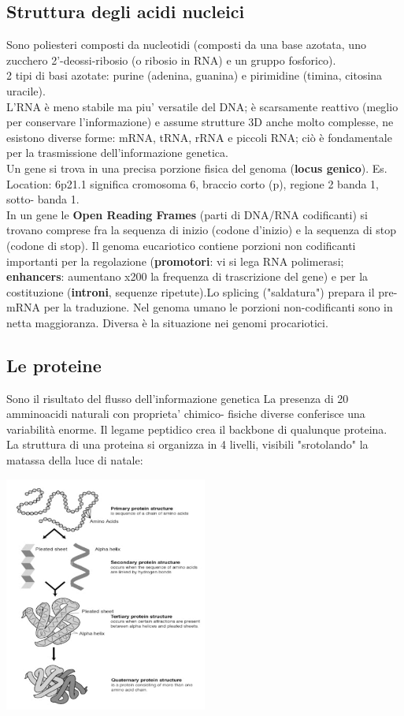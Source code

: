 \documentclass{article}
\begin{document}
\subsection{Struttura degli acidi nucleici}
Sono poliesteri composti da nucleotidi (composti da una base azotata, uno
zucchero 2'-deossi-ribosio (o ribosio in RNA) e un gruppo fosforico).\\
2 tipi di basi azotate: purine (adenina, guanina) e pirimidine (timina, citosina
uracile).\\
L'RNA è meno stabile ma piu' versatile del DNA; è scarsamente reattivo
(meglio per conservare l'informazione) e assume strutture 3D anche molto
complesse, ne esistono diverse forme: mRNA, tRNA, rRNA e piccoli RNA; ciò è
fondamentale per la trasmissione dell'informazione genetica.\\
Un gene si trova in una precisa porzione fisica del genoma (\textbf{locus genico}).
Es. Location: 6p21.1 significa cromosoma 6, braccio corto (p), regione 2 banda 1, sotto-
banda 1.\\
In un gene le \textbf{Open Reading Frames} (parti di DNA/RNA codificanti) si
trovano comprese fra la sequenza di inizio (codone d'inizio) e la sequenza
di stop (codone di stop). Il genoma eucariotico contiene porzioni non codificanti importanti per la
regolazione (\textbf{promotori}: vi si lega RNA polimerasi; \textbf{enhancers}: aumentano
x200 la frequenza di trascrizione del gene) e per la costituzione (\textbf{introni},
sequenze ripetute).Lo splicing ("saldatura") prepara il pre-mRNA per la
traduzione. Nel genoma umano le porzioni non-codificanti sono in netta
maggioranza. Diversa è la situazione nei genomi procariotici.
\subsection{Le proteine}
Sono il risultato del flusso dell'informazione genetica
La presenza di 20 amminoacidi naturali con proprieta' chimico-
fisiche diverse conferisce una variabilità enorme. Il legame peptidico crea il backbone di qualunque proteina.\\
La struttura di una proteina si organizza in 4 livelli, visibili "srotolando" la
matassa della luce di natale:
\begin{center}
    \includegraphics[width=0.5\textwidth]{figures/Proteine.png}
\end{center}
\end{document}
